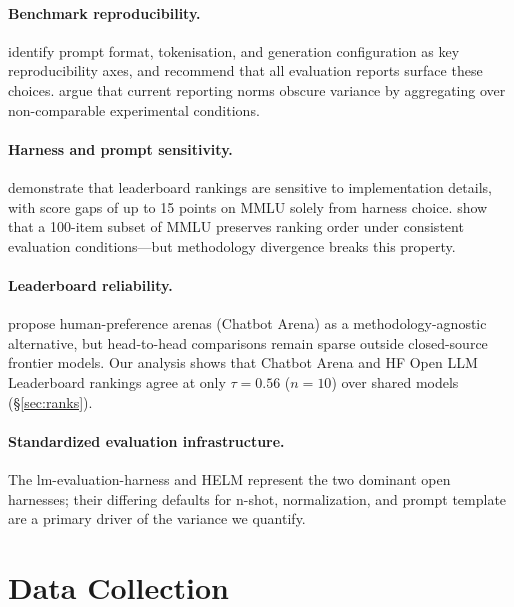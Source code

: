 \documentclass[11pt]{article}
\begin{document}
\paragraph{Benchmark reproducibility.}
\citet{biderman-2024-lessons} identify prompt format, tokenisation, and
generation configuration as key reproducibility axes, and recommend
that all evaluation reports surface these choices.
\citet{burnell-2023-rethink} argue that current reporting norms obscure
variance by aggregating over non-comparable experimental conditions.

\paragraph{Harness and prompt sensitivity.}
\citet{alzahrani-2024-benchmarks} demonstrate that leaderboard rankings
are sensitive to implementation details, with score gaps of up to 15 points
on MMLU solely from harness choice.
\citet{polo-2024-tinybenchmarks} show that a 100-item subset of MMLU
preserves ranking order under consistent evaluation conditions---but
methodology divergence breaks this property.

\paragraph{Leaderboard reliability.}
\citet{chiang-2024-chatbot} propose human-preference arenas (Chatbot Arena)
as a methodology-agnostic alternative, but head-to-head comparisons remain
sparse outside closed-source frontier models.
Our analysis shows that Chatbot Arena and HF Open LLM Leaderboard rankings
agree at only $\tau = 0.56$ ($n=10$) over shared models (\S\ref{sec:ranks}).

\paragraph{Standardized evaluation infrastructure.}
The lm-evaluation-harness \citep{gao-2021-framework} and HELM
\citep{liang-2022-holistic} represent the two dominant open harnesses;
their differing defaults for n-shot, normalization, and prompt template
are a primary driver of the variance we quantify.

\section{Data Collection}
\end{document}
